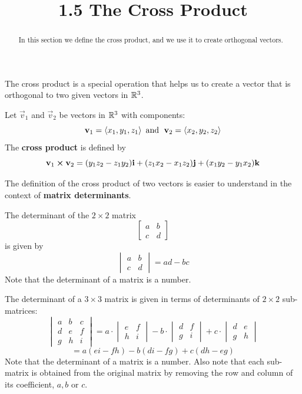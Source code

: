 \documentclass[handout]{ximera}
\title{1.5 The Cross Product}
\begin{document}
\begin{abstract}
In this section we define the cross product, and we use it to create orthogonal vectors.
\end{abstract}
 
\maketitle
The cross product is a special operation that helps us to create a vector that is orthogonal to two given vectors in $\mathbb R^3$.
\begin{definition}
Let $\vec{v}_1$ and $\vec{v}_2$ be vectors in $\mathbb R^3$ with components:
\[
\mathbf{v}_1 = \left\langle x_1, y_1, z_1\right\rangle \text{  and   } \;\mathbf{v}_2 = \left\langle x_2, y_2, z_2\right\rangle
\]
The \textbf{cross product} is defined by
\[
\mathbf{v}_1 \boldsymbol\times \mathbf{v}_2 =  (y_1z_2 - z_1y_2) \mathbf{i} + (z_1x_2 - x_1z_2) \mathbf{j} + (x_1y_2 - y_1x_2) \mathbf{k} 
\]
\end{definition}

The definition of the cross product of two vectors is easier to understand in the context of \textbf{matrix determinants}.

\begin{definition}
The determinant of the $2 \times 2$ matrix 
\[
\begin{bmatrix}
a & b\\
c & d
\end{bmatrix}
\]
is  given by
\[
\begin{vmatrix}
a & b\\
c & d
\end{vmatrix}
= ad-bc
\]
Note that the determinant of a matrix is a number.
\end{definition}

\begin{definition}
The determinant of a $3 \times 3$ matrix is given in terms of determinants of $2 \times 2$ sub-matrices:
\[
\begin{vmatrix}
a & b & c\\
d & e & f\\
g & h & i
\end{vmatrix}
= a \cdot
\begin{vmatrix}
 e & f\\
 h & i
\end{vmatrix}
-b\cdot
\begin{vmatrix}
d  & f\\
g  & i
\end{vmatrix}
+c \cdot
\begin{vmatrix}
d & e \\
g & h 
\end{vmatrix}
\]
\[
= a(ei-fh) - b(di-fg) + c(dh-eg)
\]
Note that the determinant of a matrix is a number. 
Also note that each sub-matrix is obtained from the original matrix by removing the row and column of its coefficient, $a, b$ or $c$. 
\end{definition}
\end{document}
